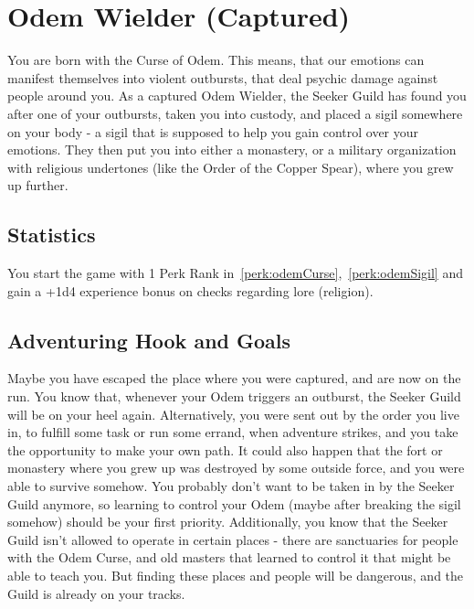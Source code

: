 \section{Odem Wielder (Captured)}\label{background:odemWielderCaptured}
You are born with the Curse of Odem.
This means, that our emotions can manifest themselves into violent outbursts, that deal psychic damage against people around you.
As a captured Odem Wielder, the Seeker Guild has found you after one of your outbursts, taken you into custody, and placed a sigil somewhere on your body - a sigil that is supposed to help you gain control over your emotions.
They then put you into either a monastery, or a military organization with religious undertones (like the Order of the Copper Spear), where you grew up further.

\subsection{Statistics}
You start the game with 1 Perk Rank in~\ref{perk:odemCurse},~\ref{perk:odemSigil} and gain a +1d4 experience bonus on checks regarding lore (religion).

\subsection{Adventuring Hook and Goals}
Maybe you have escaped the place where you were captured, and are now on the run.
You know that, whenever your Odem triggers an outburst, the Seeker Guild will be on your heel again.
Alternatively, you were sent out by the order you live in, to fulfill some task or run some errand, when adventure strikes, and you take the opportunity to make your own path.
It could also happen that the fort or monastery where you grew up was destroyed by some outside force, and you were able to survive somehow.
You probably don't want to be taken in by the Seeker Guild anymore, so learning to control your Odem (maybe after breaking the sigil somehow) should be your first priority.
Additionally, you know that the Seeker Guild isn't allowed to operate in certain places - there are sanctuaries for people with the Odem Curse, and old masters that learned to control it that might be able to teach you.
But finding these places and people will be dangerous, and the Guild is already on your tracks.